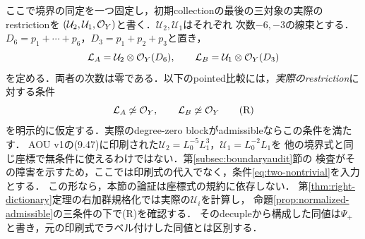 ここで境界の同定を一つ固定し，初期collectionの最後の三対象の実際のrestrictionを
$(\mathcal U_2,\mathcal U_1,\mathcal O_Y)$と書く．$\mathcal U_2,\mathcal U_1$はそれぞれ
次数$-6,-3$の線束とする．$D_6=p_1+\cdots+p_6$，$D_3=p_1+p_2+p_3$と置き，
\begin{equation}\label{eq:two-degree-zero}
\mathcal L_A=\mathcal U_2\otimes\mathcal O_Y(D_6),\qquad
\mathcal L_B=\mathcal U_1\otimes\mathcal O_Y(D_3)
\end{equation}
を定める．両者の次数は零である．以下のpointed比較には，\emph{実際のrestriction}に対する条件
\begin{equation}\label{eq:two-nontrivial}
\mathcal L_A\not\simeq\mathcal O_Y,\qquad\mathcal L_B\not\simeq\mathcal O_Y
\tag{R}
\end{equation}
を明示的に仮定する．実際のdegree-zero blockがadmissibleならこの条件を満たす．
AOU v1の(9.47)に印刷された$\mathcal U_2=L_0^{-5}L_1^3$，$\mathcal U_1=L_0^{-2}L_1$を
他の境界式と同じ座標で無条件に使えるわけではない．第\ref{subsec:boundaryaudit}節の
検査がその障害を示すため，ここでは印刷式の代入でなく，条件\eqref{eq:two-nontrivial}を入力とする．
この形なら，本節の論証は座標式の規約に依存しない．
第\ref{thm:right-dictionary}定理の右加群規格化では実際の$\mathcal U_i$を計算し，
命題\ref{prop:normalized-admissible}の三条件の下で(R)を確認する．
そのdecupleから構成した同値は$\Psi_+$と書き，元の印刷式でラベル付けした同値とは区別する．


